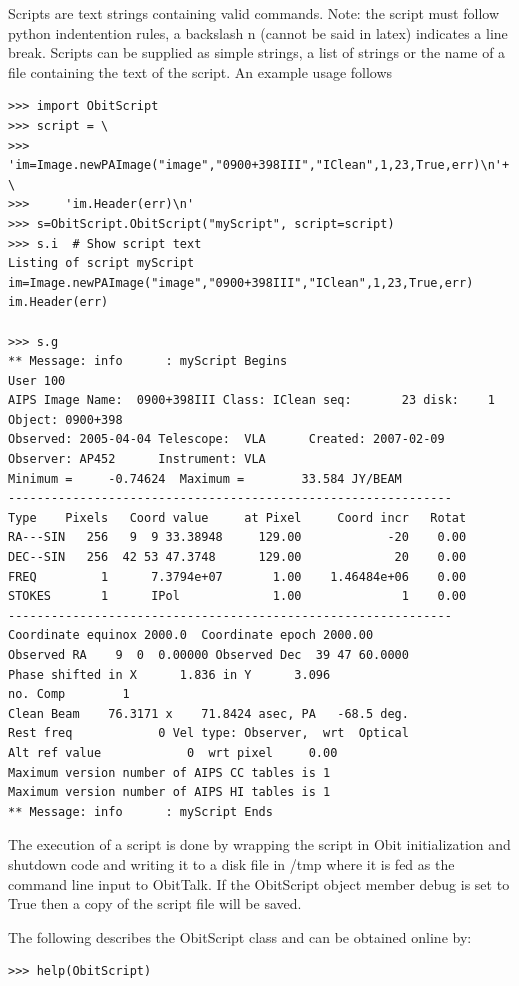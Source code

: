 \documentclass[11pt]{report}
\begin{document}
Scripts are text strings containing valid commands.
Note: the script must follow python indentention rules, a backslash n 
(cannot be said in latex) indicates a line break.
Scripts can be supplied as simple strings, a list of strings or the
name of a file containing the text of the script.
An example usage follows
\begin{verbatim}
>>> import ObitScript
>>> script = \
>>>     'im=Image.newPAImage("image","0900+398III","IClean",1,23,True,err)\n'+ \
>>>     'im.Header(err)\n'
>>> s=ObitScript.ObitScript("myScript", script=script)
>>> s.i  # Show script text
Listing of script myScript
im=Image.newPAImage("image","0900+398III","IClean",1,23,True,err)
im.Header(err)

>>> s.g
** Message: info      : myScript Begins
User 100
AIPS Image Name:  0900+398III Class: IClean seq:       23 disk:    1
Object: 0900+398
Observed: 2005-04-04 Telescope:  VLA      Created: 2007-02-09
Observer: AP452      Instrument: VLA      
Minimum =     -0.74624  Maximum =        33.584 JY/BEAM 
--------------------------------------------------------------
Type    Pixels   Coord value     at Pixel     Coord incr   Rotat
RA---SIN   256   9  9 33.38948     129.00            -20    0.00
DEC--SIN   256  42 53 47.3748      129.00             20    0.00
FREQ         1      7.3794e+07       1.00    1.46484e+06    0.00
STOKES       1      IPol             1.00              1    0.00
--------------------------------------------------------------
Coordinate equinox 2000.0  Coordinate epoch 2000.00
Observed RA    9  0  0.00000 Observed Dec  39 47 60.0000 
Phase shifted in X      1.836 in Y      3.096
no. Comp        1
Clean Beam    76.3171 x    71.8424 asec, PA   -68.5 deg.
Rest freq            0 Vel type: Observer,  wrt  Optical
Alt ref value            0  wrt pixel     0.00
Maximum version number of AIPS CC tables is 1 
Maximum version number of AIPS HI tables is 1 
** Message: info      : myScript Ends
\end{verbatim}

The execution of a script is done by wrapping the script in Obit
initialization and shutdown code and writing it to a disk file in /tmp
where it is fed as the command line input to ObitTalk.
If the ObitScript object member debug is set to True then a copy
of the script file will be saved.

The following describes the ObitScript class and can be obtained
online by:
\begin{verbatim}
>>> help(ObitScript)
\end{verbatim}
\end{document}
